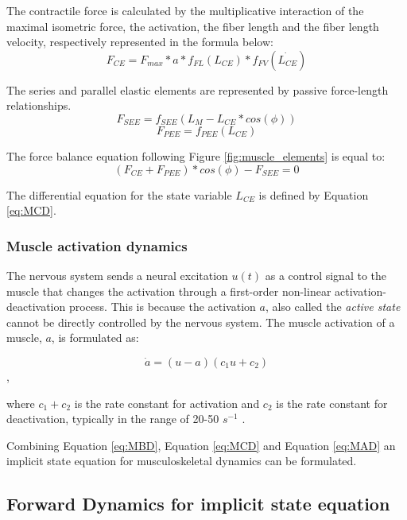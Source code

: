 The contractile force is calculated by the multiplicative interaction of the maximal isometric force, the activation, the fiber length and the fiber length velocity, respectively represented in the formula below:
\begin{equation}
    F_{CE} = F_{max}*a*f_{FL}(L_{CE})*f_{FV}(\dot{L_{CE}})
\end{equation}

The series and parallel elastic elements are represented by passive force-length relationships.
\begin{equation}
    F_{SEE} = f_{SEE}(L_{M}-L_{CE}*cos(\phi))
\end{equation}
\begin{equation}
    F_{PEE} = f_{PEE}(L_{CE})
\end{equation}

The force balance equation following Figure \ref{fig:muscle_elements} is equal to:
\begin{equation}
    (F_{CE}+F_{PEE})*cos(\phi) - F_{SEE} = 0
    \label{eq:MCD}
\end{equation}

The differential equation for the state variable $L_{CE}$ is defined by Equation \ref{eq:MCD}.  
\newline
\subsubsection{Muscle activation dynamics}

The nervous system sends a neural excitation $u(t)$ as a control signal to the muscle that changes the activation through a first-order non-linear activation-deactivation process. This is because the activation $a$, also called the \textit{ active state} cannot be directly controlled by the nervous system. The  muscle activation of a muscle, $a$, is formulated as:

\begin{equation}
    \dot{a} = (u-a)(c_{1}u + c_{2})
    \label{eq:MAD}
\end{equation},

where $c_{1} + c_{2}$ is the rate constant for activation and $c_{2}$ is the rate constant for deactivation, typically in the range of 20-50 $s^{-1}$ \cite{IMP}.

Combining Equation \ref{eq:MBD}, Equation \ref{eq:MCD} and Equation \ref{eq:MAD} an implicit state equation for musculoskeletal dynamics can be formulated.  

\subsection{Forward Dynamics for implicit state equation}\label{forward}

